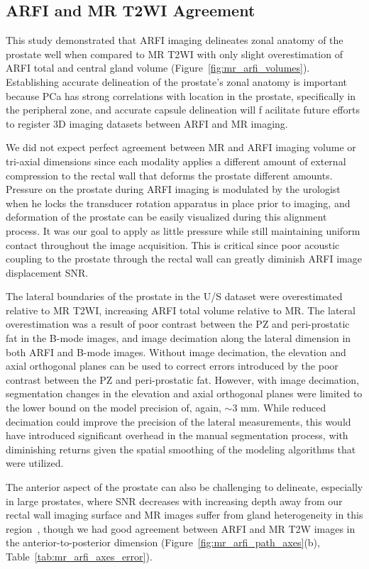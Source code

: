 \subsection{ARFI and MR T2WI Agreement}
This study demonstrated that ARFI imaging delineates zonal anatomy of the
prostate well when compared to MR T2WI with only slight overestimation of 
ARFI total and central gland volume (Figure~\ref{fig:mr_arfi_volumes}). 
 Establishing accurate delineation of the prostate's zonal anatomy is 
important because PCa has strong correlations with location in the prostate, 
specifically in the peripheral zone, and accurate capsule delineation will f
acilitate future efforts to register 3D imaging datasets between ARFI and MR imaging. 

We did not expect perfect agreement between MR and ARFI imaging volume or tri-axial
 dimensions since each modality applies a different amount of external compression to 
the rectal wall that deforms the prostate different amounts. Pressure on the prostate 
during ARFI imaging is modulated by the urologist when he locks the transducer rotation 
apparatus in place prior to imaging, and deformation of the prostate can be easily visualized
 during this alignment process.  It was our goal to apply as little pressure while still maintaining
 uniform contact throughout the image acquisition. This is critical since poor acoustic coupling to 
the prostate through the rectal wall can greatly diminish ARFI image displacement SNR.

The lateral boundaries of the prostate in the U/S dataset were overestimated relative to MR T2WI, increasing 
ARFI total volume relative to MR. The lateral overestimation was a result of poor contrast between the PZ and 
peri-prostatic fat in the B-mode images, and image decimation along the lateral dimension in both ARFI and B-mode 
images. Without image decimation, the elevation and axial orthogonal planes can be used to correct errors introduced
 by the poor contrast between the PZ and peri-prostatic fat. However, with image decimation, segmentation changes in 
the elevation and axial orthogonal planes were limited to the lower bound on the model precision of, again, $\sim$3 mm.
 While reduced decimation could improve the precision of the lateral measurements, this would have introduced significant 
overhead in the manual segmentation process, with diminishing returns given the spatial smoothing of the modeling algorithms
 that were utilized. 

The anterior aspect of the prostate can also be challenging to delineate,
especially in large prostates, where SNR decreases with increasing depth away
from our rectal wall imaging surface and MR images suffer from gland
heterogeneity in this region~\cite{Gupta2013}, though we had good agreement
between ARFI and MR T2W images in the anterior-to-posterior dimension
(Figure~\ref{fig:mr_arfi_path_axes}(b), Table~\ref{tab:mr_arfi_axes_error}).

